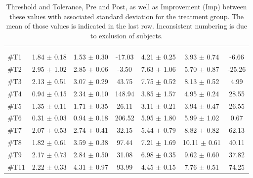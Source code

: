\begin{longtable} {l|c|c|c|c|c|c}
	\caption{Threshold and Tolerance, Pre and Post, as well as Improvement (Imp) between these values with associated standard deviation for the treatment group. The mean of those values is indicated in the last row. Inconsistent numbering is due to exclusion of subjects.}
	\label{tab:Treatment} \\
\cellcolor[HTML]{C0C0C0} {} & 
\multicolumn{3}{c|}{ \cellcolor[HTML]{C0C0C0}{\textbf{Threshold}}} & \multicolumn{3}{c}{ \cellcolor[HTML]{C0C0C0}{\textbf{Tolerance}}}  	\\  \rule{0pt}{3ex} 
  \cellcolor[HTML]{C0C0C0}{} &
 \multicolumn{1}{c|}{ \cellcolor[HTML]{C0C0C0}{Pre [kgF]}} & \multicolumn{1}{c|}{ \cellcolor[HTML]{C0C0C0}{Post [kgF]}} &
 \multicolumn{1}{c|}{ \cellcolor[HTML]{C0C0C0}{Imp [\%]}} 
 & \multicolumn{1}{|c|}{ \cellcolor[HTML]{C0C0C0}{Pre [kgF]}} 
 & \multicolumn{1}{c|}{ \cellcolor[HTML]{C0C0C0}{Post [kgF]}} 
 & \multicolumn{1}{c}{ \cellcolor[HTML]{C0C0C0}{Imp [\%]}} 
 	\\ \hline 
\#T1 & 1.84 $\pm$ 0.18 & 1.53 $\pm$ 0.30 & -17.03
& 4.21 $\pm$ 0.25 & 3.93 $\pm$ 0.74 & -6.66\\ \hline
\#T2 & 2.95 $\pm$ 1.02 & 2.85 $\pm$ 0.06 & -3.50 & 7.63 $\pm$ 1.06  & 5.70 $\pm$ 0.87 & -25.26\\ \hline
\#T3 & 2.13 $\pm$ 0.51 & 3.07 $\pm$ 0.29 & 43.75 & 7.75 $\pm$ 0.52 & 8.13 $\pm$ 0.52 & 4.99 \\ \hline
\#T4 & 0.94 $\pm$ 0.15 & 2.34 $\pm$ 0.10 & 148.94 & 3.85 $\pm$ 1.57 & 4.95 $\pm$ 0.24 & 28.55\\ \hline
\#T5 & 1.35 $\pm$ 0.11 & 1.71 $\pm$ 0.35 & 26.11 & 3.11 $\pm$ 0.21  & 3.94 $\pm$ 0.47 & 26.55 \\ \hline	
\#T6 & 0.31 $\pm$ 0.03 & 0.94 $\pm$ 0.18 & 206.52 & 5.95 $\pm$ 1.80 & 5.99 $\pm$  1.02 & 0.67\\ \hline
\#T7 & 2.07 $\pm$ 0.53 & 2.74 $\pm$ 0.41 & 32.15 & 5.44 $\pm$ 0.79 & 8.82 $\pm$ 0.82 & 62.13  \\ \hline
\#T8 & 1.82 $\pm$ 0.61 & 3.59 $\pm$ 0.38 & 97.44 & 7.21 $\pm$ 1.69 & 10.11 $\pm$ 0.61 & 40.11 \\ \hline
\#T9 & 2.17 $\pm$ 0.73 & 2.84 $\pm$ 0.50 & 31.08 & 6.98 $\pm$  0.35 & 9.62 $\pm$ 0.60 & 37.82 \\ \hline
\#T11 & 2.22 $\pm$ 0.33 & 4.31 $\pm$ 0.97 & 93.99 & 4.45 $\pm$ 0.15 & 7.76 $\pm$  0.51 & 74.25 \\ \hline

\end{longtable}

